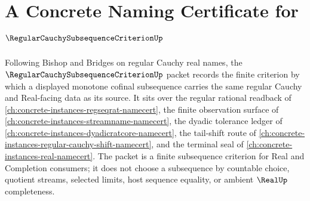 \chapter{A Concrete Naming Certificate for $\RegularCauchySubsequenceCriterionUp$}
\label{ch:concrete-instances-regular-cauchy-subsequence-criterion-namecert}

Following Bishop and Bridges on regular Cauchy real names, the $\RegularCauchySubsequenceCriterionUp$ packet records the finite criterion by which a displayed monotone cofinal subsequence carries the same regular Cauchy and Real-facing data as its source. It sits over the regular rational readback of \autoref{ch:concrete-instances-regseqrat-namecert}, the finite observation surface of \autoref{ch:concrete-instances-streamname-namecert}, the dyadic tolerance ledger of \autoref{ch:concrete-instances-dyadicratcore-namecert}, the tail-shift route of \autoref{ch:concrete-instances-regular-cauchy-shift-namecert}, and the terminal seal of \autoref{ch:concrete-instances-real-namecert}. The packet is a finite subsequence criterion for Real and Completion consumers; it does not choose a subsequence by countable choice, quotient streams, selected limits, host sequence equality, or ambient $\RealUp$ completeness.

